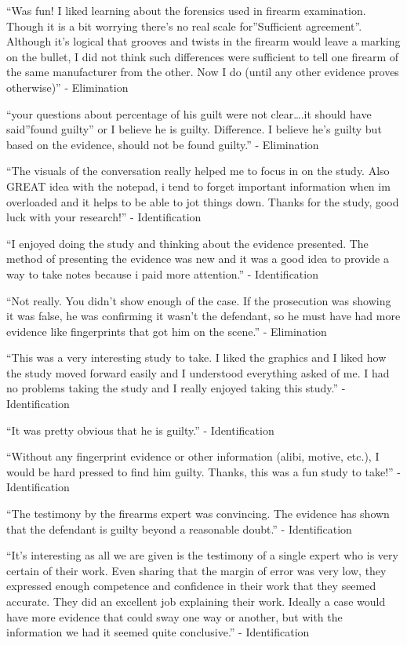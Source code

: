\documentclass[print]{nuthesis}
\begin{document}
``Was fun! I liked learning about the forensics used in firearm examination. Though it is a bit worrying there's no real scale for''Sufficient agreement''. Although it's logical that grooves and twists in the firearm would leave a marking on the bullet, I did not think such differences were sufficient to tell one firearm of the same manufacturer from the other. Now I do (until any other evidence proves otherwise)'' - Elimination

``your questions about percentage of his guilt were not clear\ldots.it should have said''found guilty'' or I believe he is guilty. Difference. I believe he's guilty but based on the evidence, should not be found guilty.'' - Elimination

``The visuals of the conversation really helped me to focus in on the study. Also GREAT idea with the notepad, i tend to forget important information when im overloaded and it helps to be able to jot things down. Thanks for the study, good luck with your research!'' - Identification

``I enjoyed doing the study and thinking about the evidence presented. The method of presenting the evidence was new and it was a good idea to provide a way to take notes because i paid more attention.'' - Identification

``Not really. You didn't show enough of the case. If the prosecution was showing it was false, he was confirming it wasn't the defendant, so he must have had more evidence like fingerprints that got him on the scene.'' - Elimination

``This was a very interesting study to take. I liked the graphics and I liked how the study moved forward easily and I understood everything asked of me. I had no problems taking the study and I really enjoyed taking this study.'' - Identification

``It was pretty obvious that he is guilty.'' - Identification

``Without any fingerprint evidence or other information (alibi, motive, etc.), I would be hard pressed to find him guilty. Thanks, this was a fun study to take!'' - Identification

``The testimony by the firearms expert was convincing. The evidence has shown that the defendant is guilty beyond a reasonable doubt.'' - Identification

``It's interesting as all we are given is the testimony of a single expert who is very certain of their work. Even sharing that the margin of error was very low, they expressed enough competence and confidence in their work that they seemed accurate. They did an excellent job explaining their work. Ideally a case would have more evidence that could sway one way or another, but with the information we had it seemed quite conclusive.'' - Identification
\end{document}
